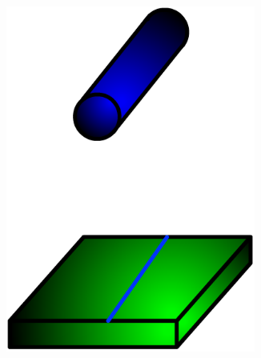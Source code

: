 \documentclass[10pt,fleqn]{article} %
\begin{document}
\begin{figure}[h]
\begin{subfigure}[b]{0.3\textwidth}
    \includegraphics[width=0.9\textwidth,height=.2\textheight,keepaspectratio]{images/cylindre-plan}
    \caption{}
  \end{subfigure}\hfill
  \begin{subfigure}[b]{0.3\textwidth}
    \centering

\end{subfigure}
\end{figure}
\end{document}
